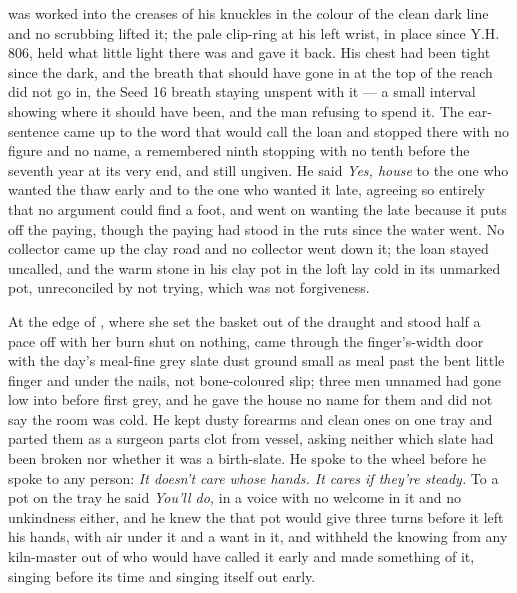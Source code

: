  was worked into the creases of his knuckles in the colour of the clean dark line and no scrubbing lifted it; the pale clip-ring at his left wrist, in place since Y.H. 806, held what little light there was and gave it back. His chest had been tight since the dark, and the breath that should have gone in at the top of the reach did not go in, the Seed 16 breath staying unspent with it --- a small interval showing where it should have been, and the man refusing to spend it. The ear-sentence came up to the word that would call the loan and stopped there with no figure and no name, a remembered ninth stopping with no tenth before the seventh year at its very end, and still ungiven. He said \emph{Yes, house} to the one who wanted the thaw early and to the one who wanted it late, agreeing so entirely that no argument could find a foot, and went on wanting the late because it puts off the paying, though the paying had stood in the ruts since the water went. No collector came up the clay road and no collector went down it; the loan stayed uncalled, and the warm stone in his clay pot in the loft lay cold in its unmarked pot, unreconciled by not trying, which was not forgiveness.

At the edge of , where she set the basket out of the draught and stood half a pace off with her burn shut on nothing,  came through the finger's-width door with the day's meal-fine grey slate dust ground small as meal past the bent little finger and under the nails, not bone-coloured slip; three men unnamed had gone low into  before first grey, and he gave the house no name for them and did not say the room was cold. He kept dusty forearms and clean ones on one tray and parted them as a surgeon parts clot from vessel, asking neither which slate had been broken nor whether it was a birth-slate. He spoke to the wheel before he spoke to any person: \emph{It doesn't care whose hands. It cares if they're steady.} To a pot on the tray he said \emph{You'll do,} in a voice with no welcome in it and no unkindness either, and he knew the  that pot would give three turns before it left his hands, with air under it and a want in it, and withheld the knowing from any kiln-master out of  who would have called it early and made something of it, singing before its time and singing itself out early.


